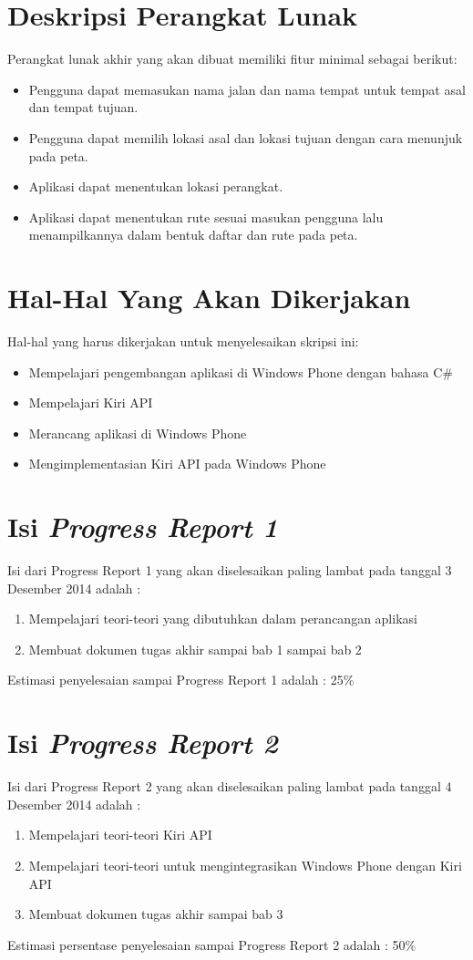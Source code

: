 \documentclass[a4paper,twoside]{article}
\begin{document}
\section{Deskripsi Perangkat Lunak}
Perangkat lunak akhir yang akan dibuat memiliki fitur minimal sebagai berikut:
\begin{itemize}
	\item Pengguna dapat memasukan nama jalan dan nama tempat untuk tempat asal dan tempat tujuan.
	\item Pengguna dapat memilih lokasi asal dan lokasi tujuan dengan cara menunjuk pada peta.
	\item Aplikasi dapat menentukan lokasi perangkat.
	\item Aplikasi dapat menentukan rute sesuai masukan pengguna lalu menampilkannya dalam bentuk daftar dan rute pada peta.
\end{itemize}

\section{Hal-Hal Yang Akan Dikerjakan}
Hal-hal yang harus dikerjakan untuk menyelesaikan skripsi ini:
\begin{itemize}
	\item Mempelajari pengembangan aplikasi di Windows Phone dengan bahasa C\#
	\item Mempelajari Kiri API
	\item Merancang aplikasi di Windows Phone
	\item Mengimplementasian Kiri API pada Windows Phone
\end{itemize}

\section{Isi {\it Progress Report 1}}
Isi dari Progress Report 1 yang akan diselesaikan paling lambat pada tanggal 3 Desember 2014 adalah :
\begin{enumerate}
	\item Mempelajari teori-teori yang dibutuhkan dalam perancangan aplikasi
	\item Membuat dokumen tugas akhir sampai bab 1 sampai bab 2
\end{enumerate}
Estimasi penyelesaian sampai Progress Report 1 adalah : 25\%

\section{Isi {\it Progress Report 2}}
Isi dari Progress Report 2 yang akan diselesaikan paling lambat pada tanggal 4 Desember 2014 adalah :
\begin{enumerate}
	\item Mempelajari teori-teori Kiri API
	\item Mempelajari teori-teori untuk mengintegrasikan Windows Phone dengan Kiri API
	\item Membuat dokumen tugas akhir sampai bab 3
\end{enumerate}
Estimasi persentase penyelesaian sampai Progress Report 2 adalah : 50\%
\vspace{1.5cm}
\end{document}
